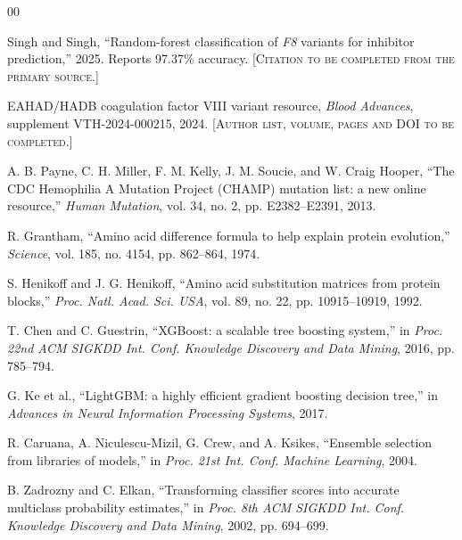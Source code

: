 \documentclass[conference]{IEEEtran}
\begin{document}
\begin{thebibliography}{00}

 Singh and Singh, ``Random-forest classification of \textit{F8}
variants for inhibitor prediction,'' 2025. Reports 97.37\% accuracy.
\textsc{[Citation to be completed from the primary source.]}

 EAHAD/HADB coagulation factor VIII variant resource,
\textit{Blood Advances}, supplement VTH-2024-000215, 2024.
\textsc{[Author list, volume, pages and DOI to be completed.]}

 A. B. Payne, C. H. Miller, F. M. Kelly, J. M. Soucie, and
W. Craig Hooper, ``The CDC Hemophilia A Mutation Project (CHAMP) mutation
list: a new online resource,'' \textit{Human Mutation}, vol. 34, no. 2,
pp. E2382--E2391, 2013.

 R. Grantham, ``Amino acid difference formula to help explain
protein evolution,'' \textit{Science}, vol. 185, no. 4154, pp. 862--864, 1974.

 S. Henikoff and J. G. Henikoff, ``Amino acid substitution
matrices from protein blocks,'' \textit{Proc. Natl. Acad. Sci. USA}, vol. 89,
no. 22, pp. 10915--10919, 1992.

 T. Chen and C. Guestrin, ``XGBoost: a scalable tree boosting
system,'' in \textit{Proc. 22nd ACM SIGKDD Int. Conf. Knowledge Discovery and
Data Mining}, 2016, pp. 785--794.

 G. Ke et al., ``LightGBM: a highly efficient gradient
boosting decision tree,'' in \textit{Advances in Neural Information Processing
Systems}, 2017.

 R. Caruana, A. Niculescu-Mizil, G. Crew, and A. Ksikes,
``Ensemble selection from libraries of models,'' in \textit{Proc. 21st Int.
Conf. Machine Learning}, 2004.

 B. Zadrozny and C. Elkan, ``Transforming classifier scores
into accurate multiclass probability estimates,'' in \textit{Proc. 8th ACM
SIGKDD Int. Conf. Knowledge Discovery and Data Mining}, 2002, pp. 694--699.


\end{thebibliography}
\end{document}
